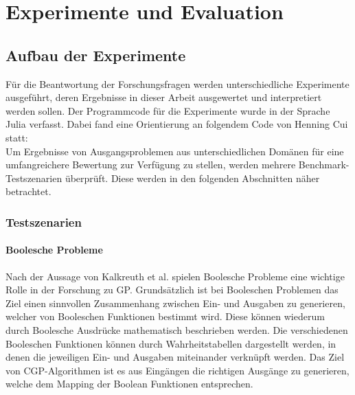 \chapter{Experimente und Evaluation}
\label{praktischer Teil}

\section{Aufbau der Experimente}
\label{sec:aufbauExperimente}

Für die Beantwortung der Forschungsfragen werden unterschiedliche Experimente ausgeführt, deren Ergebnisse in dieser Arbeit ausgewertet und interpretiert werden sollen.
Der Programmcode für die Experimente wurde in der Sprache Julia verfasst.
Dabei fand eine Orientierung an folgendem Code von Henning Cui statt: \cite{cuihen_cuihencgp_with_crossover_strategies_2024}\\
Um Ergebnisse von Ausgangsproblemen aus unterschiedlichen Domänen für eine umfangreichere Bewertung zur Verfügung zu stellen, werden mehrere Benchmark-Testszenarien überprüft.
Diese werden in den folgenden Abschnitten näher betrachtet.

\subsection{Testszenarien}
\label{subsec:testszenarien}

\subsubsection{Boolesche Probleme}
\label{subsubsec:booleanProblems}

Nach der Aussage von Kalkreuth et al. spielen Boolesche Probleme eine wichtige Rolle in der Forschung zu GP.
Grundsätzlich ist bei Booleschen Problemen das Ziel einen sinnvollen Zusammenhang zwischen Ein- und Ausgaben zu generieren, welcher von Booleschen Funktionen bestimmt wird.
Diese können wiederum durch Boolesche Ausdrücke mathematisch beschrieben werden.
Die verschiedenen Booleschen Funktionen können durch Wahrheitstabellen dargestellt werden, in denen die jeweiligen Ein- und Ausgaben miteinander verknüpft werden. \cite{kalkreuth_towards_2023}
Das Ziel von CGP-Algorithmen ist es aus Eingängen die richtigen Ausgänge zu generieren, welche dem Mapping der Boolean Funktionen entsprechen.\\


